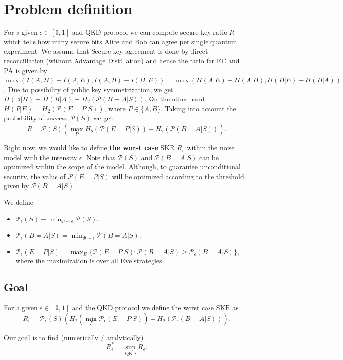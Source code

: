 \documentclass[12pt,a4paper,reqno, aps, superscriptaddress]{amsart}
\newcommand{\PP}{\ensuremath{\mathcal{P}}}
\begin{document}
\section{Problem definition}
For a given $\epsilon \in [0,1]$ and QKD protocol we can compute secure key 
ratio $R$ which tells how many secure bits Alice and Bob can agree per single 
quantum experiment. We assume that Secure key agreement is done by 
direct-reconciliation (without Advantage Distillation) and hence the ratio for 
EC and PA is given by $\max(I(A;B) - I(A;E),I(A;B) -I(B;E)) = 
\max(H(A|E)-H(A|B),H(B|E)-H(B|A))$. Due to possibility of public key 
symmetrization, we get $H(A|B)=H(B|A)=H_2(\PP(B=A|S))$. On the other hand 
$H(P|E)=H_2(\PP(E=P|S))$, where $P \in \{A,B\}$. Taking into 
account the probability of success $\PP(S)$ we get
\begin{equation}
R = \PP(S)(\max_P H_2(\PP(E=P|S)) - H_2(\PP(B=A|S))).
\end{equation}

Right now, we would like to define \textbf{the worst case} SKR $R_\epsilon$ 
within the 
noise model with the intensity $\epsilon$. Note that $\PP(S)$ and $\PP(B=A|S)$ 
can be optimized within the scope of the model. Although, to guarantee 
unconditional security, the value of $\PP(E=P|S)$ will be optimized according 
to the threshold given by $\PP(B=A|S)$.

We define
\begin{itemize}
\item $\PP_\epsilon(S) = \min_{\Phi \sim \epsilon} \PP(S)$.
\item $\PP_\epsilon(B=A|S) = \min_{\Phi \sim \epsilon} \PP(B=A|S)$.
\item $\PP_\epsilon(E=P|S) = \max_{E} \{\PP(E=P|S): \PP(B=A|S) \ge 
\PP_\epsilon(B=A|S)\}$, where the maximization is over all Eve strategies.
\end{itemize}

\subsection{Goal}
For a given $\epsilon \in [0,1]$ and the QKD protocol we define the worst case 
SKR as
\begin{equation}
R_\epsilon = \PP_\epsilon(S)(H_2(\min_P \PP_\epsilon(E=P|S)) - 
H_2(\PP_\epsilon(B=A|S))).
\end{equation}

Our goal is to find (numerically / analytically)
\begin{equation}
R^*_\epsilon = \sup_{\text{QKD}}R_\epsilon.
\end{equation}
\end{document}
